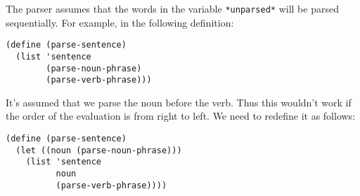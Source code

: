 \documentclass[a4paper,12pt]{article}
\begin{document}
The parser assumes that the words in the variable
\lstinline!*unparsed*! will be parsed sequentially.  For example, in
the following definition:

\begin{lstlisting}
(define (parse-sentence)
  (list 'sentence
        (parse-noun-phrase)
        (parse-verb-phrase)))
\end{lstlisting}

It's assumed that we parse the noun before the verb.  Thus this
wouldn't work if the order of the evaluation is from right to left.
We need to redefine it as follows:

\begin{lstlisting}
(define (parse-sentence)
  (let ((noun (parse-noun-phrase)))
    (list 'sentence
          noun
          (parse-verb-phrase))))
\end{lstlisting}
\end{document}

